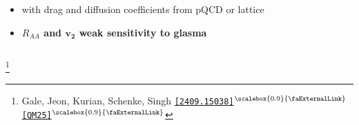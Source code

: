 \documentclass[aspectratio=169,11pt,usenames,dvipsnames]{beamer}
\renewcommand{\thefootnote}{\color{customblue}\faPaperPlaneO}
\newcommand\blfootnote[1]{%
  \begingroup
  \renewcommand\thefootnote{}\footnote{#1}%
  \addtocounter{footnote}{-1}%
  \endgroup
}
\begin{document}
\begin{frame}[t]
\begin{columns}[onlytextwidth,t]
\begin{center}
\begin{itemize}
                    \item {\color{lightgray}{\bfseries Langevin} with drag and diffusion coefficients from pQCD or lattice}\\[15pt]
                    \item {\color{destacado}\bfseries\normalsize{$R_{AA}$ and $\boldsymbol{v_2}$ weak sensitivity to glasma}}
                \end{itemize}
        \end{center}
    \end{columns}
    \blfootnote{\scriptsize Gale, Jeon, Kurian, Schenke, Singh \href{https://arxiv.org/abs/2409.15038}{{\color{palgold}\texttt{[2409.15038]$^\text{\scalebox{0.9}{\faExternalLink}}$}}} \href{https://indico.cern.ch/event/1334113/contributions/6289847/}{{\color{palgold}\texttt{[QM25]$^\text{\scalebox{0.9}{\faExternalLink}}$}}}}
\end{frame}

\end{document}
